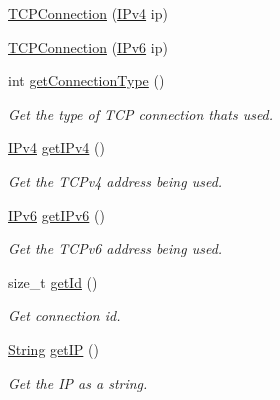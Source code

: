 \begin{DoxyCompactItemize}
\item 
\mbox{\hyperlink{class_rad_j_a_v_1_1_networking_1_1_t_c_p_connection_a0fab77382e716af1b1c425f9d5102fc2}{T\+C\+P\+Connection}} (\mbox{\hyperlink{class_rad_j_a_v_1_1_networking_1_1_i_pv4}{I\+Pv4}} ip)
\item 
\mbox{\hyperlink{class_rad_j_a_v_1_1_networking_1_1_t_c_p_connection_ae181a2c7528971d495bcefaf437729a5}{T\+C\+P\+Connection}} (\mbox{\hyperlink{class_rad_j_a_v_1_1_networking_1_1_i_pv6}{I\+Pv6}} ip)
\item 
int \mbox{\hyperlink{class_rad_j_a_v_1_1_networking_1_1_t_c_p_connection_ab3753143cc5c17927826650189c4760a}{get\+Connection\+Type}} ()
\begin{DoxyCompactList}\small\item\em Get the type of T\+CP connection that\textquotesingle{}s used. \end{DoxyCompactList}\item 
\mbox{\hyperlink{class_rad_j_a_v_1_1_networking_1_1_i_pv4}{I\+Pv4}} \mbox{\hyperlink{class_rad_j_a_v_1_1_networking_1_1_t_c_p_connection_afe488c0f221c460086b7b8e11e9c9163}{get\+I\+Pv4}} ()
\begin{DoxyCompactList}\small\item\em Get the T\+C\+Pv4 address being used. \end{DoxyCompactList}\item 
\mbox{\hyperlink{class_rad_j_a_v_1_1_networking_1_1_i_pv6}{I\+Pv6}} \mbox{\hyperlink{class_rad_j_a_v_1_1_networking_1_1_t_c_p_connection_a49cbcbef604c97fb4381d7e2982e355e}{get\+I\+Pv6}} ()
\begin{DoxyCompactList}\small\item\em Get the T\+C\+Pv6 address being used. \end{DoxyCompactList}\item 
size\+\_\+t \mbox{\hyperlink{class_rad_j_a_v_1_1_networking_1_1_t_c_p_connection_a01f3eae6b3cd97d039c89147934abb64}{get\+Id}} ()
\begin{DoxyCompactList}\small\item\em Get connection id. \end{DoxyCompactList}\item 
\mbox{\hyperlink{class_rad_j_a_v_1_1_string}{String}} \mbox{\hyperlink{class_rad_j_a_v_1_1_networking_1_1_t_c_p_connection_a380090258c8b5aa6c2f9b0b7c0bec24c}{get\+IP}} ()
\begin{DoxyCompactList}\small\item\em Get the IP as a string. \end{DoxyCompactList}\end{DoxyCompactItemize}
